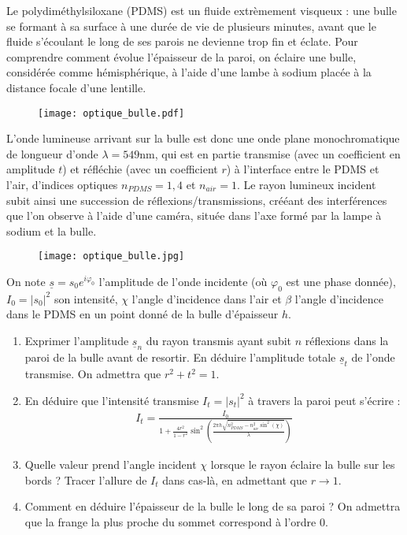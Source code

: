 Le polydiméthylsiloxane (PDMS) est un fluide extrèmement visqueux : une bulle se formant à sa surface à une durée de vie de plusieurs minutes, avant que le fluide s'écoulant le long de ses parois ne devienne trop fin et éclate. Pour comprendre comment évolue l'épaisseur de la paroi, on éclaire une bulle, considérée comme hémisphérique, à l'aide d'une lambe à sodium placée à la distance focale d'une lentille.

\begin{figure}[h]
\centering
  \texttt{[image: optique\_bulle.pdf]}
\end{figure}

L'onde lumineuse arrivant sur la bulle est donc une onde plane monochromatique de longueur d'onde $\lambda=549$nm, qui est en partie transmise (avec un coefficient en amplitude $t$) et réfléchie (avec un coefficient $r$) à l'interface entre le PDMS et l'air, d'indices optiques $n_{PDMS}=1,4$ et $n_{air}=1$. Le rayon lumineux incident subit ainsi une succession de réflexions/transmissions, crééant des interférences que l'on observe à l'aide d'une caméra, située dans l'axe formé par la lampe à sodium et la bulle. 

\begin{figure}[h]
\centering
  \texttt{[image: optique\_bulle.jpg]}
\end{figure}

On note $\underline{s}=s_0e^{i\varphi_0}$ l'amplitude de l'onde incidente (où $\varphi_0$ est une phase donnée), $I_0=|s_0|^2$ son intensité, $\chi$ l'angle d'incidence dans l'air et $\beta$ l'angle d'incidence dans le PDMS en un point donné de la bulle d'épaisseur $h$.

\begin{enumerate}

	\item Exprimer l'amplitude $\underline{s}_n$ du rayon transmis ayant subit $n$ réflexions dans la paroi de la bulle avant de resortir. En déduire l'amplitude totale $\underline{s}_t$ de l'onde transmise. On admettra que $r^2+t^2=1$.
	
	\item En déduire que l'intensité transmise $I_t=|s_t|^2$ à travers la paroi peut s'écrire : 
	\begin{align*}
		I_t = \frac{I_0}{1+\frac{4r^2}{1-r^2}\sin^2\left(\frac{2\pi h\sqrt{n_{PDMS}^2-n^2_{air}\sin^2(\chi)}}{\lambda}\right)  }
	\end{align*}
	
	\item Quelle valeur prend l'angle incident $\chi$ lorsque le rayon éclaire la bulle sur les bords ? Tracer l'allure de $I_t$ dans cas-là, en admettant que $r\longrightarrow1$.
	
	\item Comment en déduire l'épaisseur de la bulle le long de sa paroi ? On admettra que la frange la plus proche du sommet correspond à l'ordre 0.

\end{enumerate}